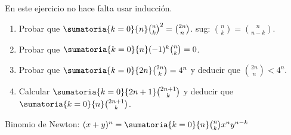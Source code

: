 \begin{enunciado}{\ejercicio}
  En este ejercicio no hace falta usar inducción.
  \begin{enumerate}[label=\roman*)]
    \item Probar que $\sumatoria{k = 0}{n} \binom{n}{k}^2 = \binom{2n}{n}$. \qquad sug: $\binom{n}{k} = \binom{n}{n-k}$.
    \item Probar que $\sumatoria{k = 0}{n} (-1)^k \binom{n}{k} = 0$.
    \item Probar que $\sumatoria{k = 0}{2n} \binom{2n}{k} = 4^n$ y deducir que $\binom{2n}{n} < 4^n$.
    \item Calcular $\sumatoria{k = 0}{2n+1} \binom{2n+1}{k}$ y deducir que $\sumatoria{k=0}{n} \binom{2n+1}{k}$.
  \end{enumerate}
\end{enunciado}

Binomio de Newton: $(x + y)^n = \sumatoria{k=0}{n} \binom{n}{k} x^n y^{n-k}$

